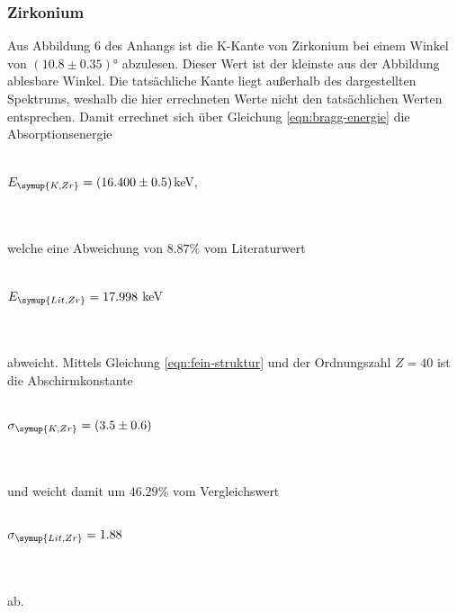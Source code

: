         \subsubsection{Zirkonium}
            Aus Abbildung 6 des Anhangs ist die K-Kante von Zirkonium bei einem 
            Winkel von $(10.8 \pm 0.35)°$ abzulesen. Dieser Wert ist der kleinste aus der Abbildung ablesbare Winkel. Die 
            tatsächliche Kante liegt außerhalb des dargestellten Spektrums, weshalb die hier errechneten Werte nicht den tatsächlichen 
            Werten entsprechen.
            Damit errechnet sich über Gleichung \eqref{eqn:bragg-energie} die Absorptionsenergie
            \\ \\
            \centerline{$E_{\symup{K, Zr}} = (16.400 \pm 0.5)$keV,}  
            \\ \\
            welche eine Abweichung von $8.87 \%$ vom Literaturwert
            \\ \\
            \centerline{$E_{\symup{Lit, Zr}} = 17.998$ keV \cite{periodic}}
            \\ \\
            abweicht. Mittels Gleichung \eqref{eqn:fein-struktur} und der Ordnungszahl $Z = 40$
            ist die Abschirmkonstante
            \\ \\
            \centerline{$\sigma_{\symup{K, Zr}} = (3.5 \pm 0.6)$} 
            \\ \\
            und weicht damit um $46.29 \%$ vom Vergleichswert
            \\ \\
            \centerline{$\sigma_{\symup{Lit, Zr}} = 1.88$}
            \\ \\
            ab.
